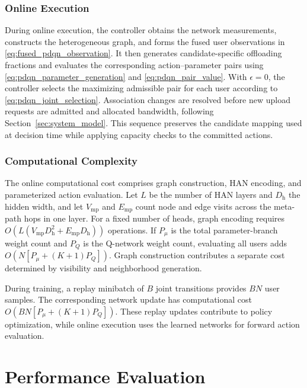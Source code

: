 \documentclass[journal]{IEEEtran}
\makeatletter
\newcommand{\LEOPageTopLayout}{%
  \setcounter{topnumber}{1}%
  \setcounter{dbltopnumber}{1}%
  \renewcommand{\topfraction}{0.92}%
  \renewcommand{\dbltopfraction}{0.80}%
  \renewcommand{\textfraction}{0.08}%
  \setlength{\textfloatsep}{10pt plus 2pt minus 2pt}%
  \setlength{\dbltextfloatsep}{10pt plus 2pt minus 2pt}%
  \setlength{\@fptop}{0pt}%
  \setlength{\@dblfptop}{0pt}%
}
\makeatother
\begin{document}
\subsubsection{Online Execution}

During online execution, the controller obtains the
network measurements, constructs the heterogeneous graph,
and forms the fused user observations in
\eqref{eq:fused_pdqn_observation}.
It then generates candidate-specific offloading fractions
and evaluates the corresponding action--parameter pairs
using \eqref{eq:pdqn_parameter_generation} and
\eqref{eq:pdqn_pair_value}.
With $\epsilon=0$, the controller selects the maximizing
admissible pair for each user according to
\eqref{eq:pdqn_joint_selection}.
Association changes are resolved before new upload
requests are admitted and allocated bandwidth, following
Section~\ref{sec:system_model}.
This sequence preserves the candidate mapping used
at decision time while applying capacity checks to
the committed actions.

\subsubsection{Computational Complexity}

The online computational cost comprises graph construction,
HAN encoding, and parameterized action evaluation.
Let $L$ be the number of HAN layers and
$D_{\mathrm h}$ the hidden width, and let
$V_{\mathrm{mp}}$ and $E_{\mathrm{mp}}$ count node
and edge visits across the meta-path hops in one layer.
For a fixed number of heads, graph encoding requires
$O(L(V_{\mathrm{mp}}D_{\mathrm h}^2+
E_{\mathrm{mp}}D_{\mathrm h}))$ operations.
If $P_\mu$ is the total parameter-branch weight count
and $P_Q$ is the Q-network weight count, evaluating all
users adds $O(N[P_\mu+(K+1)P_Q])$.
Graph construction contributes a separate cost determined
by visibility and neighborhood generation.

During training, a replay minibatch of $B$ joint
transitions provides $BN$ user samples.
The corresponding network update has computational cost
$O(BN[P_\mu+(K+1)P_Q])$.
These replay updates contribute to policy optimization,
while online execution uses the learned networks
for forward action evaluation.

\FloatBarrier
\LEOPageTopLayout
\section{Performance Evaluation}
\label{sec:performance_evaluation}
\end{document}
